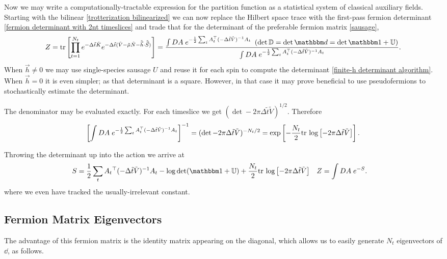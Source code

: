Now we may write a computationally-tractable expression for the partition function as a statistical system of classical auxiliary fields.
Starting with the bilinear \eqref{trotterization bilinearized} we can now replace the Hilbert space trace with the first-pass fermion determinant \eqref{fermion determinant with 2nt timeslices} and trade that for the determinant of the preferable fermion matrix \eqref{sausage},
\begin{align}
	Z=\tr{\prod_{t=1}^{N_t} e^{-\Delta \tilde{t}\tilde{K}}  e^{-\Delta \tilde{t}(\tilde{V} - \tilde{\mu}\tilde{N} - \tilde{\vec{h}}\cdot\tilde{\vec{S}})} }
	= 
	\frac{  
		\int DA\; e^{-\frac{1}{2} \sum_t A\transpose_t (-\Delta\tilde{t} \tilde{V})\inverse A_t}
	~	\left(\det \DD = \det \dd = \det \one + \UU \right)
	}{ 
		\int DA\; e^{-\frac{1}{2} \sum_t A\transpose_t (-\Delta\tilde{t} \tilde{V})\inverse A_t}
	}.
\end{align}
When $\vec{h}\neq 0$ we may use single-species sausage $U$ and reuse it for each spin to compute the determinant \eqref{finite-h determinant algorithm}.
When $\vec{h} = 0$ it is even simpler; as that determinant is a square.
However, in that case it may prove beneficial to use pseudofermions to stochastically estimate the determinant.

The denominator may be evaluated exactly.
For each timeslice we get $(\det -2\pi \Delta\tilde{t} \tilde{V})^{1/2}$.
Therefore
\begin{align}
	\left[\int DA\; e^{-\frac{1}{2} \sum_t A{}^{\top}_t (-\Delta\tilde{t} \tilde{V})^{-1} A_t}\right]^{-1}
	=
	(\det -2\pi \Delta\tilde{t} \tilde{V})^{-N_t/2}
	=
	\exp\left[ -\frac{N_t}{2} \text{tr log}\left[ -2\pi \Delta\tilde{t} \tilde{V}\right] \right].
\end{align}

Throwing the determinant up into the action we arrive at
\begin{align}
	S &= \half \sum_t A_t\transpose (-\Delta\tilde{t}\tilde{V})\inverse A_t - \log\det(\one+\UU) + \frac{N_t}{2} \trlog{ -2\pi \Delta\tilde{t}\tilde{V} }
	&
	Z &= \int DA\; e^{-S}.
	\label{eq:computational partition function}
\end{align}
where we even have tracked the usually-irrelevant constant.

\subsection{Fermion Matrix Eigenvectors}

The advantage of this fermion matrix is the identity matrix appearing on the diagonal, which allows us to easily generate $N_t$ eigenvectors of $\dd$, as follows.

